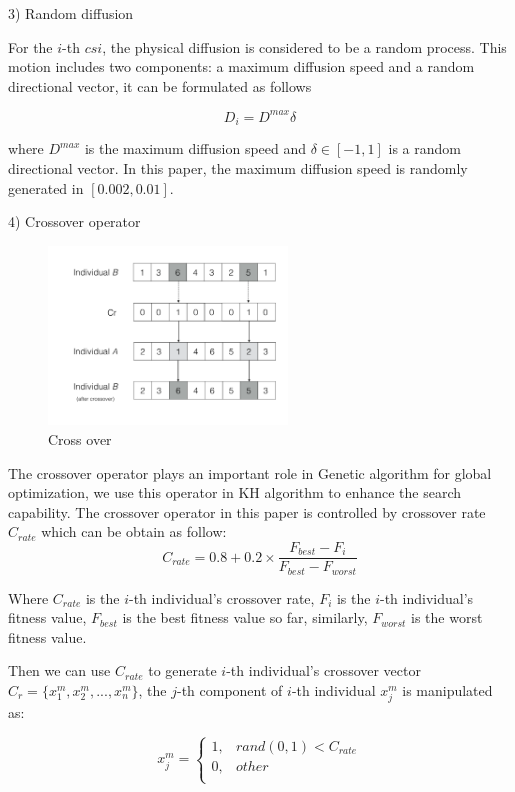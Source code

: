 \documentclass[10pt,journal,compsoc]{IEEEtran}
\begin{document}
3) Random diffusion

For the $i$-th $csi$, the physical diffusion is considered to be a random process. This motion includes two components: a maximum diffusion speed and a random directional vector, it can be formulated as follows

\begin{equation}
D_i = D^{max}\delta
\end{equation}

where $D^{max}$ is the maximum diffusion speed and $\delta \in [-1, 1]$ is a random directional vector. In this paper, the maximum diffusion speed is randomly generated in $[0.002, 0.01]$. 

4) Crossover operator

\begin{figure}[!t]
\centering
\includegraphics[width=2.5in]{./img/pic4.pdf}
\caption{Cross over}
\label{fig_opportunistic}
\end{figure}


The crossover operator plays an important role in Genetic algorithm for global optimization, we use this operator in KH algorithm to enhance the search capability. The crossover operator in this paper is controlled by crossover rate $C_{rate}$ which can be obtain as follow:
\begin{equation}
C_{rate} = 0.8 + 0.2 \times \frac{F_{best}-F_{i}}{F_{best}-F_{worst}}
\end{equation}

Where $C_{rate}$ is the $i$-th individual's crossover rate, $F_{i}$ is the $i$-th individual's fitness value, $F_{best}$ is the best fitness value so far, similarly, $F_{worst}$ is the worst fitness value.

Then we can use $C_{rate}$ to generate $i$-th individual's crossover vector $C_r = \{x_{1}^m,x_{2}^m,...,x_{n}^m\}$, the $j$-th component of $i$-th individual $x_{j}^{m}$ is manipulated as:

\begin{equation}
x_{j}^m=
\begin{cases}
1,& rand(0,1) < C_{rate}\\
0,& other\\
\end{cases}
\end{equation}
\end{document}
